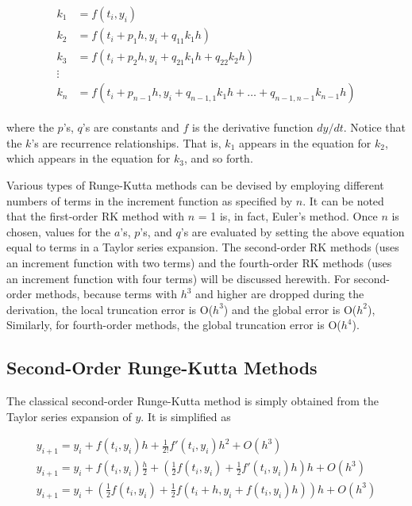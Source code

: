 \documentclass[book.tex]{subfiles}
\begin{document}
\begin{eqnarray*}
	\begin{split}
		k_1 &= f(t_i,y_i) \\
		k_2 &= f(t_i + p_1h,y_i + q_{11}k_1h)\\
		k_3 &= f(t_i + p_2h,y_i + q_{21}k_1h+ q_{22}k_2h)\\	
		\vdots&\\
		k_n &= f(t_i + p_{n-1}h,y_i + q_{n-1,1}k_1h + \dots + q_{n-1,n-1}k_{n-1}h)
	\end{split}
\end{eqnarray*}

where the $p$’s, $q$’s are constants and $f$ is the derivative function $dy/dt$. Notice that the $k$’s are recurrence relationships. That is, $k_1$ appears in the equation for $k_2$, which appears in the equation for $k_3$, and so forth.

Various types of Runge-Kutta methods can be devised by employing different numbers
of terms in the increment function as specified by $n$. It can be noted that the first-order RK method with $n$ = 1 is, in fact, Euler’s method. Once $n$ is chosen, values for the $a$’s, $p$’s, and $q$’s are evaluated by setting the above equation equal to terms in a Taylor series expansion. The second-order RK methods (uses an increment
function with two terms) and the fourth-order RK methods (uses an increment
function with four terms) will be discussed herewith. For second-order methods, because terms with $h^3$ and higher are dropped during the derivation, the local truncation error is O($h^3$) and the global error is O($h^2$), Similarly, for fourth-order methods, the global truncation error is O($h^4$).

\subsection{Second-Order Runge-Kutta Methods}

The classical second-order Runge-Kutta method is simply obtained from the Taylor series expansion of $y$. It is simplified as

\begin{eqnarray*}
y_{i+1} = y_i + f(t_i,y_i)h + \frac{1}{2!}f'(t_i,y_i)h^2 + O(h^3)	\\
y_{i+1} = y_i + f(t_i,y_i)\frac{h}{2} + (\frac{1}{2}f(t_i,y_i) + \frac{1}{2}f'(t_i,y_i)h)h + O(h^3)\\
y_{i+1} = y_i + (\frac{1}{2}f(t_i,y_i) + \frac{1}{2}f(t_i+h,y_i + f(t_i,y_i)h))h + O(h^3)
\end{eqnarray*}
\end{document}
